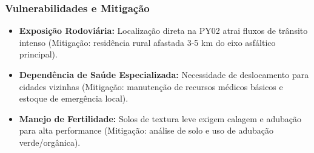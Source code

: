 \subsubsection{Vulnerabilidades e
Mitigação}

\begin{itemize}
\tightlist
\item
  \textbf{Exposição Rodoviária:} Localização direta na PY02 atrai fluxos
  de trânsito intenso (Mitigação: residência rural afastada 3-5 km do
  eixo asfáltico principal).
\item
  \textbf{Dependência de Saúde Especializada:} Necessidade de
  deslocamento para cidades vizinhas (Mitigação: manutenção de recursos
  médicos básicos e estoque de emergência local).
\item
  \textbf{Manejo de Fertilidade:} Solos de textura leve exigem calagem e
  adubação para alta performance (Mitigação: análise de solo e uso de
  adubação verde/\allowbreak orgânica).
\end{itemize}


